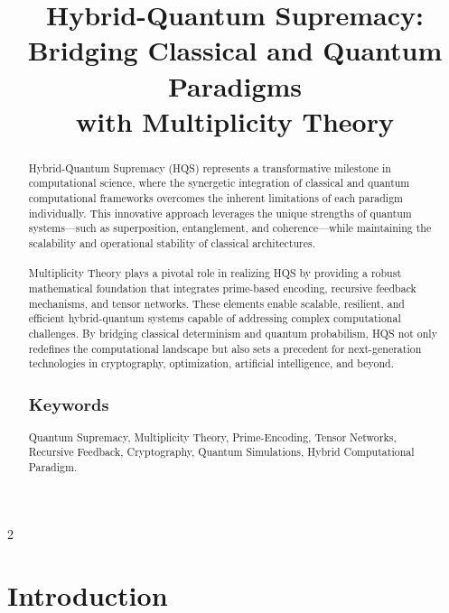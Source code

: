 \documentclass{article}
\theoremstyle{plain}
\begin{document}
\title{Hybrid-Quantum Supremacy: \\ Bridging Classical and Quantum Paradigms \\ with Multiplicity Theory}
\maketitle

\begin{abstract}
Hybrid-Quantum Supremacy (HQS) represents a transformative milestone in computational science, where the synergetic integration of classical and quantum computational frameworks overcomes the inherent limitations of each paradigm individually. This innovative approach leverages the unique strengths of quantum systems—such as superposition, entanglement, and coherence—while maintaining the scalability and operational stability of classical architectures. 

\paragraph{}Multiplicity Theory plays a pivotal role in realizing HQS by providing a robust mathematical foundation that integrates prime-based encoding, recursive feedback mechanisms, and tensor networks. These elements enable scalable, resilient, and efficient hybrid-quantum systems capable of addressing complex computational challenges. By bridging classical determinism and quantum probabilism, HQS not only redefines the computational landscape but also sets a precedent for next-generation technologies in cryptography, optimization, artificial intelligence, and beyond.

\subsection*{Keywords}
Quantum Supremacy, Multiplicity Theory, Prime-Encoding, Tensor Networks, Recursive Feedback, Cryptography, Quantum Simulations, Hybrid Computational Paradigm.

\end{abstract}
\newpage
\begin{multicols}{2}
\begin{singlespace}
\tableofcontents
\end{singlespace}
\end{multicols}

\section{Introduction}
\end{document}

